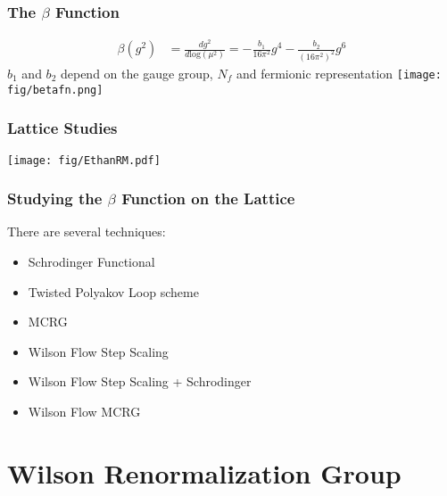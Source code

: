 \documentclass{beamer}
\begin{document}
  \begin{frame}
    \frametitle{The $\beta$ Function}
    \centering
    \begin{align*}
      \beta(g^2)&=\frac{d g^2}{d\text{log}(\mu^2)}=-\frac{b_1}{16\pi^2}g^4-\frac{b_2}{(16\pi^2)^2}g^6
    \end{align*}
    \vspace{10pt}
    \tiny{$b_1$ and $b_2$ depend on the gauge group, $N_f$ and fermionic representation}
    \vspace{10pt}
    \centering
    \texttt{[image: fig/betafn.png]}
  \end{frame}

  \begin{frame}
    \frametitle{Lattice Studies}
    \centering
    \texttt{[image: fig/EthanRM.pdf]}
  \end{frame}

  \begin{frame}
    \frametitle{Studying the $\beta$ Function on the Lattice}
    \begin{center}
      There are several techniques:
    \end{center}
    \begin{itemize}
      \item Schrodinger Functional
      \item Twisted Polyakov Loop scheme
      \item MCRG
      \item Wilson Flow Step Scaling
      \item Wilson Flow Step Scaling + Schrodinger
      \item Wilson Flow MCRG
    \end{itemize}
  \end{frame}

  \section{Wilson Renormalization Group}
  \addtocounter{framenumber}{-1}
\end{document}
